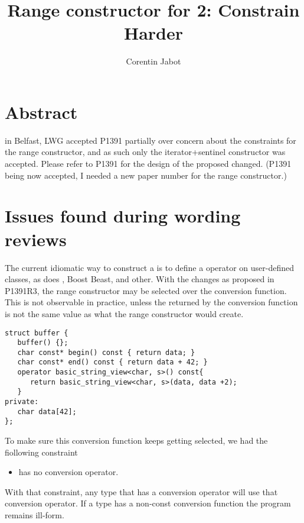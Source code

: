 \documentclass{wg21}
\title{Range constructor for \tcode{std::string\_view} 2: Constrain Harder}
\author{Corentin Jabot}{corentin.jabot@gmail.com}
\begin{document}
\maketitle

\section{Abstract}

in Belfast, LWG accepted P1391 partially over concern about the constraints for the range constructor, and as such only the iterator+sentinel
constructor was accepted. Please refer to P1391 for the design of the proposed changed.
(P1391 being now accepted, I needed a new paper number for the range constructor.)


\section{Issues found during wording reviews}

The current idiomatic way to construct a  is to define a  operator on user-defined classes, 
as does ,  Boost Beast,  and other.
With the changes as proposed in P1391R3, the range constructor may be selected over the conversion function.
This is not observable in practice, unless the  returned by the conversion function is not the same value as what the range constructor would create.

\begin{verbatim}
struct buffer {
   buffer() {};
   char const* begin() const { return data; }
   char const* end() const { return data + 42; }
   operator basic_string_view<char, s>() const{
      return basic_string_view<char, s>(data, data +2);
   }
private:
   char data[42];
};
\end{verbatim}

To make sure this conversion function keeps getting selected, we had the fiollowing constraint

\begin{itemize}

\item {} has no  conversion operator.

\end{itemize}

With that constraint, any type that has a conversion operator will use that conversion operator.
If a  type has a non-const conversion function the program remains ill-form.
\end{document}
